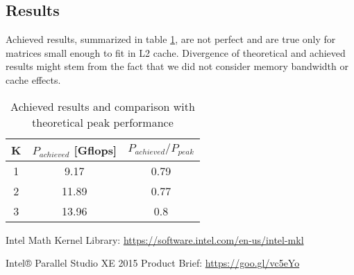 \documentclass[journal, a4paper]{IEEEtran}
\begin{document}
   \subsection{Results}  
    Achieved results, summarized in table \ref{tab:results}, are not perfect and are true only for matrices small enough to fit in L2 cache. Divergence of theoretical and achieved results might stem from the fact that we did not consider memory bandwidth or cache effects.
  
  \begin{table}[!hbt]
    \begin{center}
      \caption{Achieved results and comparison with theoretical peak performance}
      \label{tab:results}
      \begin{tabular}{c|c|c}
	K	& $P_{achieved}$ [Gflops] & $P_{achieved} / P_{peak}$\\
	\hline
	1	& 9.17 & 0.79 \\
	\hline
	2	& 11.89 & 0.77 \\
	\hline
	3	& 13.96 & 0.8
      \end{tabular}
    \end{center}
  \end{table}

   


\begin{thebibliography}{5}
	
	Intel Math Kernel Library: \url{https://software.intel.com/en-us/intel-mkl}
	
	Intel® Parallel Studio XE 2015 Product Brief: \url{https://goo.gl/vc5eYo}

\end{thebibliography}

\end{document}
